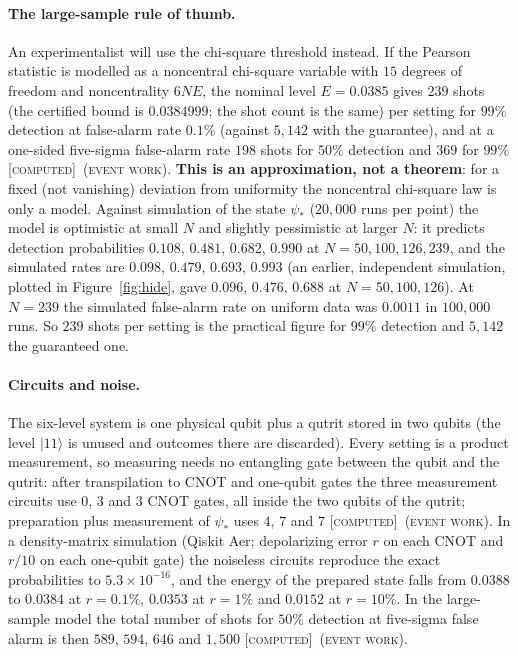 \documentclass[11pt]{article}
\newcommand{\E}{E}                       %
\newcommand{\st}[1]{\textsc{[#1]}}
\newcommand{\stcomp}{\st{computed}}
\newcommand{\event}{\textsc{(event work)}}
\theoremstyle{definition}
\theoremstyle{remark}
\begin{document}
\paragraph{The large-sample rule of thumb.} An experimentalist will use the chi-square threshold instead. If the
Pearson statistic is modelled as a noncentral chi-square variable with $15$ degrees of freedom and noncentrality
$6N\E$, the nominal level $\E=0.0385$ gives $239$ shots (the certified bound is $0.0384999$; the shot count is the same) per setting for $99\%$ detection at false-alarm rate $0.1\%$
(against $5{,}142$ with the guarantee), and at a one-sided five-sigma false-alarm rate $198$ shots for $50\%$
detection and $369$ for $99\%$ \stcomp\ \event.
\textbf{This is an approximation, not a theorem}: for a fixed (not vanishing) deviation from uniformity the
noncentral chi-square law is only a model. Against simulation of the state $\psi_\ast$ ($20{,}000$ runs per point)
the model is optimistic at small $N$ and slightly pessimistic at larger $N$: it predicts detection probabilities
$0.108$, $0.481$, $0.682$, $0.990$ at $N=50,100,126,239$, and the simulated rates are $0.098$, $0.479$, $0.693$,
$0.993$ (an earlier, independent simulation, plotted in Figure~\ref{fig:hide}, gave $0.096$, $0.476$, $0.688$ at
$N=50,100,126$). At $N=239$ the simulated false-alarm rate on uniform data was $0.0011$ in $100{,}000$ runs. So
$239$ shots per setting is the practical figure for $99\%$ detection and $5{,}142$ the guaranteed one.

\paragraph{Circuits and noise.} The six-level system is one physical qubit plus a qutrit stored in two qubits (the
level $|11\rangle$ is unused and outcomes there are discarded). Every setting is a product measurement, so
measuring needs no entangling gate between the qubit and the qutrit: after transpilation to CNOT and one-qubit
gates the three measurement circuits use $0$, $3$ and $3$ CNOT gates, all inside the two qubits of the qutrit;
preparation plus measurement of $\psi_\ast$ uses $4$, $7$ and $7$ \stcomp\ \event. In a density-matrix simulation
(Qiskit Aer; depolarizing error $r$ on each CNOT and $r/10$ on each one-qubit gate) the noiseless circuits reproduce
the exact probabilities to $5.3\times10^{-16}$, and the energy of the prepared state falls from $0.0388$ to
$0.0384$ at $r=0.1\%$, $0.0353$ at $r=1\%$ and $0.0152$ at $r=10\%$. In the large-sample model the total number of
shots for $50\%$ detection at five-sigma false alarm is then $589$, $594$, $646$ and $1{,}500$ \stcomp\ \event.
\end{document}
